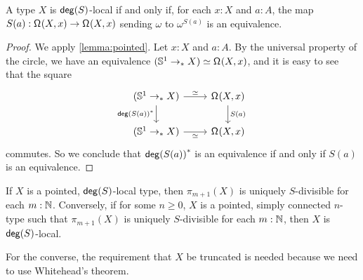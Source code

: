 \begin{lem}
A type $X$ is $\mathsf{deg}(S)$-local if and only if, for each $x:X$ and $a:A$, the map
$S(a) : \mathsf{\Omega}^{}(X,x) \to \mathsf{\Omega}^{}(X,x)$ sending 
$\omega$ to $\omega^{S(a)}$ is an equivalence.
\end{lem}

\begin{proof}
We apply \cref{lemma:pointed}.
Let $x:X$ and $a:A$.
By the universal property of the circle, we have an equivalence
$(\mathbb{S}^{1} \to_{\ast} X) \simeq \mathsf{\Omega}^{}(X,x)$,
and it is easy to see that the square
\[
  \begin{tikzcd}
    (\sphere{1} \pto X) \arrow[r,"\simeq"] \arrow[d,swap,"\precomp{\degg(S(a))}"] & \loopspace{X,x} \arrow[d,"S(a)"] \\
    (\sphere{1} \pto X) \arrow[r,swap,"\simeq"] & \loopspace{X,x}
  \end{tikzcd}
\]
commutes.
So we conclude that ${\mathsf{deg}(S(a))}^\ast$ is an equivalence if and only if $S(a)$ is an equivalence.
\end{proof}

\begin{prop}\label{prop:homotopygroupsoflocalarelocal}
    If $X$ is a pointed, $\mathsf{deg}(S)$-local type, then $\pi_{m+1}(X)$ is uniquely $S$-divisible
    for each $m : \mathbb{N}$.
    Conversely, if for some $n \geq 0$, $X$ is a pointed, simply connected $n$-type
    such that $\pi_{m+1}(X)$ is uniquely $S$-divisible for each $m : \mathbb{N}$,
    then $X$ is $\mathsf{deg}(S)$-local.
\end{prop}

For the converse, the requirement that $X$ be truncated is needed because
we need to use Whitehead's theorem.

